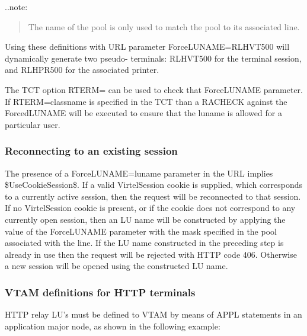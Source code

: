 \documentclass[letterpaper,10pt,english]{sphinxmanual}
\begin{document}

..note:
\begin{quote}

The name of the pool is only used to match the pool to its associated line.
\end{quote}

Using these definitions with URL parameter ForceLUNAME=RLHVT500 will dynamically generate two pseudo- terminals: RLHVT500 for the terminal session, and RLHPR500 for the associated printer.

The TCT option RTERM= can be used to check that ForceLUNAME parameter. If RTERM=classname is specified in the TCT than a RACHECK against the ForcedLUNAME will be executed to ensure that the luname is allowed for a particular user.


\subsubsection{Reconnecting to an existing session}
\label{\detokenize{connectivity_guide:reconnecting-to-an-existing-session}}
The presence of a ForceLUNAME=luname parameter in the URL implies \$UseCookieSession\$. If a valid VirtelSession cookie is supplied, which corresponds to a currently active session, then the request will be reconnected to that session. If no VirtelSession cookie is present, or if the cookie does not correspond to any currently open session, then an LU name will be constructed by applying the value of the ForceLUNAME parameter with the mask specified in the pool associated with the line. If the LU name constructed in the preceding step is already in use then the request will be rejected with HTTP code 406. Otherwise a new session will be opened using the constructed LU name.


\subsubsection{VTAM definitions for HTTP terminals}
\label{\detokenize{connectivity_guide:vtam-definitions-for-http-terminals}}
HTTP relay LU’s must be defined to VTAM by means of APPL statements in an application major node, as shown in the following example:
\end{document}
